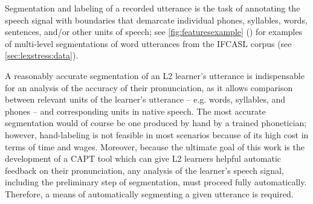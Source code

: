 
Segmentation
and labeling
of a recorded utterance is the task of annotating the speech signal with boundaries that demarcate individual phones, syllables, words, sentences, and/or other units of speech; see 
	\cref{fig:featuresexample} ()
	for examples of multi-level segmentations of word utterances from the IFCASL corpus (see \cref{sec:lexstress:data}).
	


A reasonably accurate segmentation of an L2 learner's utterance is indispensable for an analysis of the accuracy of their pronunciation, 
as it allows comparison between relevant units of the learner's utterance -- e.g. words, syllables, and phones -- and corresponding units in native speech. 
The most accurate segmentation would of course be one produced by hand by a trained phonetician; however, hand-labeling is not feasible in most scenarios because of its high cost in terms of time and wages. Moreover, because the ultimate goal of this work is the development of a CAPT tool which can give L2 learners helpful automatic feedback on their pronunciation, 
any analysis of the learner's speech signal, including the preliminary step of segmentation, must proceed fully automatically. Therefore, a means of automatically segmenting a given utterance is required.



	
